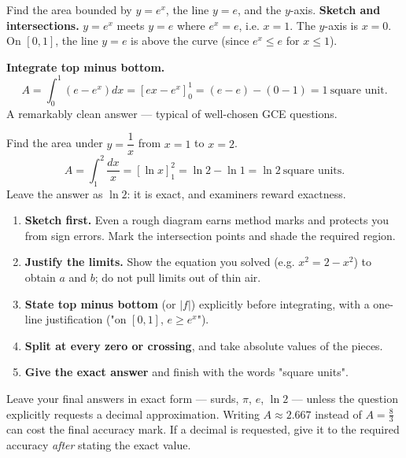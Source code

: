 \documentclass[11pt]{article}
\newcounter{popsec}
\newcounter{popsub}
\newcommand{\courssub}[1]{%
  \stepcounter{popsub}%
  \par\vspace{9pt}\noindent{\popxbold\fontsize{11.5}{13}\selectfont\color{popink}{\color{poporange}\thepopsec.\thepopsub}\hspace{6pt}#1}\par\nopagebreak\vspace{4pt}
}
\begin{document}
\begin{exoresolu}
Find the area bounded by $y = e^x$, the line $y = e$, and the $y$-axis.
\tcblower
\textbf{Sketch and intersections.} $y = e^x$ meets $y = e$ where $e^x = e$, i.e. $x = 1$. The $y$-axis is $x = 0$. On $[0,1]$, the line $y = e$ is above the curve (since $e^x \leq e$ for $x \leq 1$).

\textbf{Integrate top minus bottom.}
\[
A = \int_0^1 \left(e - e^x\right) dx = \left[ex - e^x\right]_0^1 = (e - e) - (0 - 1) = 1\ \text{square unit}.
\]
A remarkably clean answer — typical of well-chosen GCE questions.
\end{exoresolu}

\begin{exemplebox}
Find the area under $y = \dfrac{1}{x}$ from $x = 1$ to $x = 2$.
\[
A = \int_1^2 \frac{dx}{x} = \left[\ln x\right]_1^2 = \ln 2 - \ln 1 = \ln 2\ \text{square units}.
\]
Leave the answer as $\ln 2$: it is exact, and examiners reward exactness.
\end{exemplebox}

\courssub{Examination technique}

\begin{methode}
\begin{enumerate}
\item \textbf{Sketch first.} Even a rough diagram earns method marks and protects you from sign errors. Mark the intersection points and shade the required region.
\item \textbf{Justify the limits.} Show the equation you solved (e.g. $x^2 = 2 - x^2$) to obtain $a$ and $b$; do not pull limits out of thin air.
\item \textbf{State top minus bottom} (or $|f|$) explicitly before integrating, with a one-line justification ("on $[0,1]$, $e \geq e^x$").
\item \textbf{Split at every zero or crossing}, and take absolute values of the pieces.
\item \textbf{Give the exact answer} and finish with the words "square units".
\end{enumerate}
\end{methode}

\begin{attention}
Leave your final answers in exact form — surds, $\pi$, $e$, $\ln 2$ — unless the question explicitly requests a decimal approximation. Writing $A \approx 2.667$ instead of $A = \tfrac{8}{3}$ can cost the final accuracy mark. If a decimal is requested, give it to the required accuracy \emph{after} stating the exact value.
\end{attention}
\end{document}
